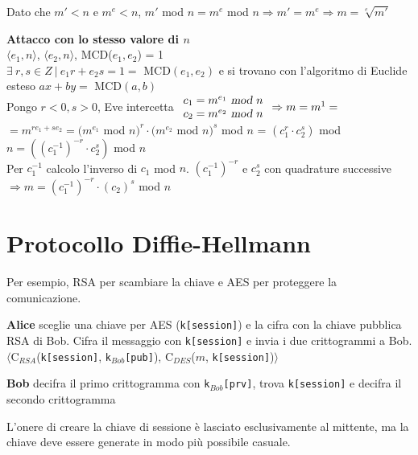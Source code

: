 \documentclass[10pt]{book}
\begin{document}
\begin{list}{}{}
Dato che $m' < n$ e $m^e < n$, $m'$ mod $n = m^e$ mod $n \Rightarrow m' = m^e \Rightarrow m = \sqrt[e]{m'}$
	\item \textbf{Attacco con lo stesso valore di $n$}\\
	$\langle e_1, n\rangle$, $\langle e_2, n\rangle$, MCD($e_1, e_2$) = 1\\
	$\exists\:r,s\in Z\:|\:e_1r + e_2s = 1 =$ MCD$(e_1, e_2)$ e si trovano con l'algoritmo di Euclide esteso $ax + by =$ MCD$(a,b)$\\
	Pongo $r < 0, s > 0$, Eve intercetta $\begin{array}{l}
	c_1 = m^{e_1}\textsl{ mod }n\\
	c_2 = m^{e_2}\textsl{ mod }n
	\end{array} \Rightarrow m = m^1 =$\\$=m^{re_1 + se_2} = (m^{e_1}$ mod $n)^r\cdot(m^{e_2}$ mod $n)^s$ mod $n$ = $(c_1^r\cdot c_2^s)$ mod $n = ((c_1^{-1})^{-r}\cdot c_2^s)$ mod $n$\\
	Per $c_1^{-1}$ calcolo l'inverso di $c_1$ mod $n$. $(c_1^{-1})^{-r}$ e $c_2^s$ con quadrature successive\\
	$\Rightarrow m = (c_1^{-1})^{-r}\cdot (c_2)^s$ mod $n$
\end{list}
\section{Protocollo Diffie-Hellmann}
Per esempio, RSA per scambiare la chiave e AES per proteggere la comunicazione. \begin{list}{}{}
	\item \textbf{Alice} sceglie una chiave per AES (\texttt{k[session]}) e la cifra con la chiave pubblica RSA di Bob. Cifra il messaggio con \texttt{k[session]} e invia i due crittogrammi a Bob.\\
	$\langle$C$_{RSA}$(\texttt{k[session]}, \texttt{k$_{Bob}$[pub]}), C$_{DES}$($m$, \texttt{k[session]})$\rangle$
	\item \textbf{Bob} decifra il primo crittogramma con \texttt{k$_{Bob}$[prv]}, trova \texttt{k[session]} e decifra il secondo crittogramma
\end{list}
L'onere di creare la chiave di sessione è lasciato esclusivamente al mittente, ma la chiave deve essere generate in modo più possibile casuale.
\end{document}
